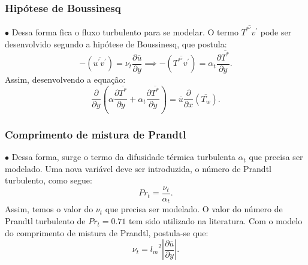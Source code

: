 \documentclass[xcolor=dvipsnames,10pt,aspectratio=169]{beamer}
\begin{document}
		
		\begin{frame}
			\frametitle{Hipótese de Boussinesq}
			$\bullet$ Dessa forma fica o fluxo turbulento para se modelar. O termo $\overline{T^{\ast\prime}  v^\prime}$ pode ser desenvolvido segundo a hipótese de Boussinesq, que postula:
			\begin{equation}\label{bou}
			-\left(\overline{ u^\prime  v^\prime}\right) = 
			\nu_t \frac{\partial{\overline{u}}}{\partial{y}}
			\implies
			-\left(\overline{ T^{\ast\prime}  v^\prime}\right) = 
			\alpha_t \frac{\partial{\overline{T^\ast}}}{\partial{y}}.
			\end{equation}
			Assim, desenvolvendo a equação: 
			\\
				\begin{equation}
				{\frac{\partial{}}{\partial{y}}} \left(\alpha {\frac{\partial{\overline{T^\ast}}}{\partial{y}}}   
				+ \alpha_t  \frac{\partial \overline{T^\ast}}{\partial y} \right)
				= 
				\overline{u}\frac{\partial{}}{\partial{x}}\left(\overline{T_w}\right) . 
				\end{equation}
		\end{frame}
	
	
	
	
		
		\begin{frame}
			\frametitle{Comprimento de mistura de Prandtl}
			$\bullet$ Dessa forma, surge o termo da difusidade térmica turbulenta $\alpha_t$ que precisa ser modelado. Uma nova variável deve ser introduzida, o número de Prandtl turbulento, como segue:
			\begin{equation}
				Pr_t = \frac{\nu_t}{\alpha_t}.
			\end{equation} 
			Assim, temos o valor do $\nu_t$ que precisa ser modelado. O valor do número de Prandtl turbulento de $ Pr_t = 0.71$ tem sido utilizado na literatura.
			Com o modelo do comprimento de mistura de Prandtl, postula-se que:
			\begin{equation}
			\nu_t = {l_m}^2 \left| \frac{\partial \overline{u}}{\partial y} \right|.
			\end{equation}
		\end{frame}
		
		
		
		
		
\end{document}
